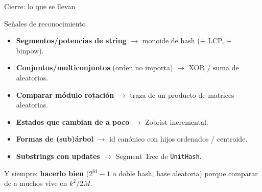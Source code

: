 \documentclass{beamer}
\begin{document}
\begin{frame}{Cierre: lo que se llevan}
\begin{block}{Señales de reconocimiento}
\footnotesize
\begin{itemize}
    \item \textbf{Segmentos/potencias de string} $\to$ monoide de hash ($+$ LCP, $+$ binpow).
    \item \textbf{Conjuntos/multiconjuntos} (orden no importa) $\to$ XOR / suma de aleatorios.
    \item \textbf{Comparar módulo rotación} $\to$ traza de un producto de matrices aleatorias.
    \item \textbf{Estados que cambian de a poco} $\to$ Zobrist incremental.
    \item \textbf{Formas de (sub)árbol} $\to$ id canónico con hijos ordenados / centroide.
    \item \textbf{Substrings con updates} $\to$ Segment Tree de \texttt{UnitHash}.
\end{itemize}
\end{block}
Y siempre: \textbf{hacerlo bien} ($2^{61}{-}1$ o doble hash, base aleatoria) porque comparar de a muchos vive en $k^2/2M$.
\end{frame}
\end{document}
